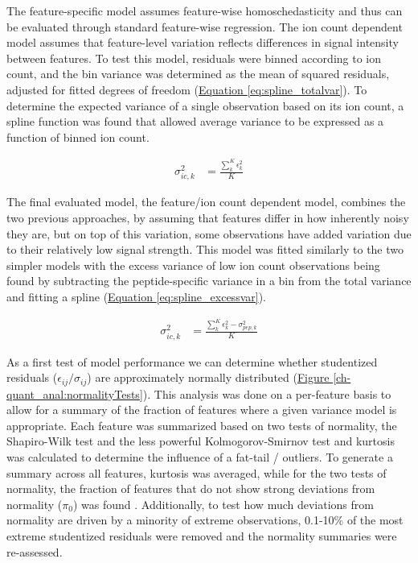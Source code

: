 The feature-specific model assumes feature-wise homoschedasticity and thus can be evaluated through standard feature-wise regression. The ion count dependent model assumes that feature-level variation reflects differences in signal intensity between features. To test this model, residuals were binned according to ion count, and the bin variance was determined as the mean of squared residuals, adjusted for fitted degrees of freedom (\hyperref[eq:spline_totalvar]{Equation \ref{eq:spline_totalvar}}). To determine the expected variance of a single observation based on its ion count, a spline function was found that allowed average variance to be expressed as a function of binned ion count.

\begin{align}
\sigma^{2}_{ic,k} &= \frac{\sum_{k}^{K}\epsilon_{k}^{2}}{K}\label{eq:spline_totalvar}
\end{align}

The final evaluated model, the feature/ion count dependent model, combines the two previous approaches, by assuming that features differ in how inherently noisy they are, but on top of this variation, some observations have added variation due to their relatively low signal strength. This model was fitted similarly to the two simpler models with the excess variance of low ion count observations being found by subtracting the peptide-specific variance in a bin from the total variance and fitting a spline (\hyperref[eq:spline_excessvar]{Equation \ref{eq:spline_excessvar}}).

\begin{align}
\sigma^{2}_{ic,k} &= \frac{\sum_{k}^{K}\epsilon_{k}^{2} - \sigma^{2}_{pep,k}}{K}\label{eq:spline_excessvar}
\end{align}

As a first test of model performance we can determine whether studentized residuals ($\epsilon_{ij} / \sigma_{ij}$) are approximately normally distributed (\hyperref[ch-quant_anal:normalityTests]{Figure \ref{ch-quant_anal:normalityTests}}). This analysis was done on a per-feature basis to allow for a summary of the fraction of features where a given variance model is appropriate. Each feature was summarized based on two tests of normality, the Shapiro-Wilk test \cite{Shapiro:1965gf} and the less powerful Kolmogorov-Smirnov test \cite{Lilliefors:1967bh} and kurtosis was calculated to determine the influence of a fat-tail / outliers. To generate a summary across all features, kurtosis was averaged, while for the two tests of normality, the fraction of features that do not show strong deviations from normality ($\pi_{0}$) was found \cite{Storey:2003cj}. Additionally, to test how much deviations from normality are driven by a minority of extreme observations, 0.1-10\% of the most extreme studentized residuals were removed and the normality summaries were re-assessed.

